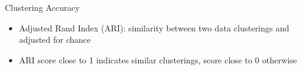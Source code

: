 \documentclass[10pt]{beamer}
\begin{document}
%
%
%
%
%


\begin{frame}{Clustering Accuracy}
\begin{itemize}
\item  Adjusted Rand Index (ARI): similarity between two data clusterings and adjusted for chance 
\item  ARI score close to 1 indicates similar clusterings, score close to 0 otherwise
\end{itemize}
\end{frame}
\end{document}
